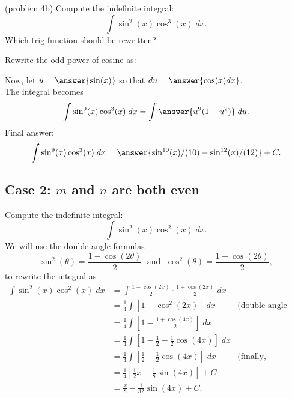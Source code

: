 \documentclass{ximera}
\begin{document}
\begin{problem}{\color{gray}(problem 4b)}
Compute the indefinite integral:
\[
\int \sin^9(x)\cos^3(x) \; dx.
\]
Which trig function should be rewritten?
\begin{multipleChoice}
\end{multipleChoice}

Rewrite the odd power of cosine as:
\begin{multipleChoice}
\end{multipleChoice}

Now, let $u = \answer{\sin(x)}$ so that $du = \answer{\cos(x) dx}$.\\
The integral becomes
\[
\int \sin^9(x)\cos^3(x) \; dx= \int \answer{u^9(1 - u^2)} \; du.
\]
Final answer:
\[
\int \sin^9(x)\cos^3(x) \; dx= \answer{\sin^{10}(x)/(10) - \sin^{12}(x)/(12) } + C.
\]
\end{problem}



\subsection{Case 2: $m$ and $n$ are both even}
\begin{example}
Compute the indefinite integral:
\[
\int \sin^2(x)\cos^2(x) \; dx.
\]
We will use the double angle formulas
\[
\sin^2(\theta) = \frac{1-\cos(2\theta)}{2} \; \text{ and } \; \cos^2(\theta) = \frac{1+\cos(2\theta)}{2},
\]
to rewrite the integral as
\begin{align*}
\int \sin^2(x)\cos^2(x) \; dx &= \int \frac{1-\cos(2x)}{2}\cdot \frac{1+\cos(2x)}{2} \; dx\\
  &= \frac14 \int \left[1 - \cos^2(2x)\right] \; dx &
  \text{(double angle formula again)}\\
  &= \frac14 \int \left[ 1- \frac{1+\cos(4x)}{2}\right] \; dx\\
  &= \frac14 \int \left[1-\frac12 - \frac12\cos(4x)\right] \; dx\\
  &= \frac14 \int \left[\frac12 - \frac12\cos(4x)\right] \; dx & \text{(finally, integrate)}\\
  &= \frac14 \left[\frac12 x  - \frac18\sin(4x)\right] + C\\
  &= \frac{x}{8}  - \frac{1}{32}\sin(4x) + C.
\end{align*}
\end{example}
\end{document}
